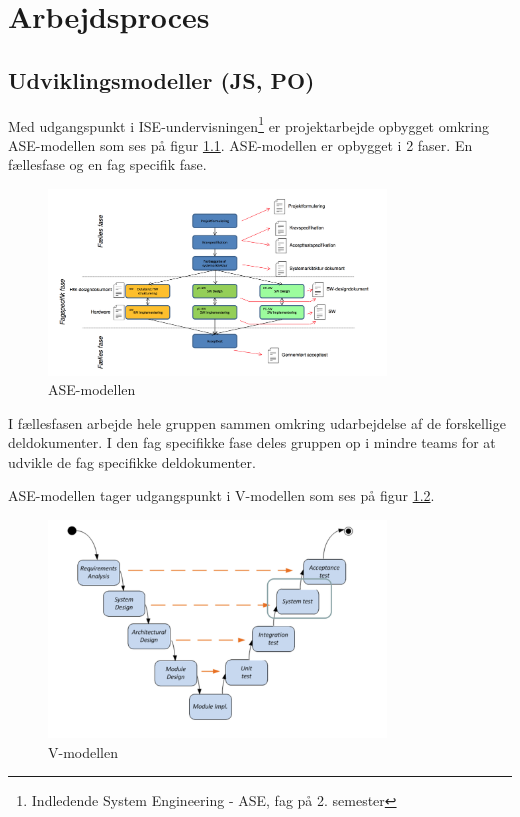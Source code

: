 \chapter{Arbejdsproces}

\section{Udviklingsmodeller (JS, PO)}
Med udgangspunkt i ISE-undervisningen\footnote{Indledende System Engineering - ASE, fag på 2. semester} er projektarbejde opbygget omkring ASE-modellen som ses på figur \ref{fig:ASE_model}. ASE-modellen er opbygget i 2 faser. En fællesfase og en fag specifik fase. 


\begin{figure}[htbp]
  \centering
    \includegraphics[width=0.8\textwidth]{billeder/ASE-modellen}
    \caption{ASE-modellen}
    \label{fig:ASE_model}
\end{figure}

I fællesfasen arbejde hele gruppen sammen omkring udarbejdelse af de forskellige deldokumenter. 
I den fag specifikke fase deles gruppen op i mindre teams for at udvikle de fag specifikke deldokumenter. 

ASE-modellen tager udgangspunkt i V-modellen som ses på figur \ref{fig:V_model}.   

\begin{figure}[htbp]
  \centering
    \includegraphics[width=0.8\textwidth]{billeder/V-modellen}
    \caption{V-modellen}
    \label{fig:V_model}
\end{figure}

